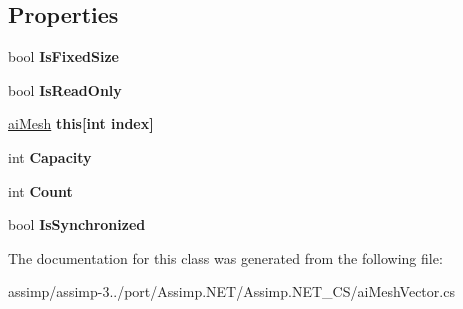 \subsection*{Properties}
\begin{DoxyCompactItemize}
\item 
\hypertarget{classai_mesh_vector_a399b16aa2e769c4ad83ad9c6c7917ca4}{bool {\bfseries Is\+Fixed\+Size}}\label{classai_mesh_vector_a399b16aa2e769c4ad83ad9c6c7917ca4}

\item 
\hypertarget{classai_mesh_vector_a2b09558597f84e94e7aa4db2f4f00ec3}{bool {\bfseries Is\+Read\+Only}}\label{classai_mesh_vector_a2b09558597f84e94e7aa4db2f4f00ec3}

\item 
\hypertarget{classai_mesh_vector_aa2a89ab3b02fef4721e18169189a9edb}{\hyperlink{structai_mesh}{ai\+Mesh} {\bfseries this\mbox{[}int index\mbox{]}}}\label{classai_mesh_vector_aa2a89ab3b02fef4721e18169189a9edb}

\item 
\hypertarget{classai_mesh_vector_ae8234316fe2653597c6960ddb4aff2bd}{int {\bfseries Capacity}}\label{classai_mesh_vector_ae8234316fe2653597c6960ddb4aff2bd}

\item 
\hypertarget{classai_mesh_vector_a0e8f62b6ae1742c7842ecd0b172aebb2}{int {\bfseries Count}}\label{classai_mesh_vector_a0e8f62b6ae1742c7842ecd0b172aebb2}

\item 
\hypertarget{classai_mesh_vector_a161d368c36eb353e1b558b03ce5ec505}{bool {\bfseries Is\+Synchronized}}\label{classai_mesh_vector_a161d368c36eb353e1b558b03ce5ec505}

\end{DoxyCompactItemize}


The documentation for this class was generated from the following file\+:\begin{DoxyCompactItemize}
\item 
assimp/assimp-\/3../port/\+Assimp.\+N\+E\+T/\+Assimp.\+N\+E\+T\+\_\+\+C\+S/ai\+Mesh\+Vector.\+cs\end{DoxyCompactItemize}
